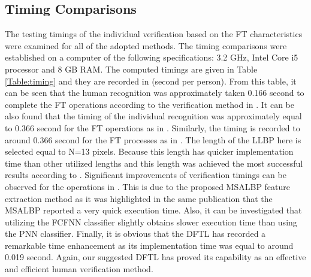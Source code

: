 \documentclass[conference]{IEEEtran}
\begin{document}
\subsection{Timing Comparisons}
The testing timings of the individual verification based on the FT characteristics were examined for all of the adopted methods. The timing comparisons were established on a computer of the following specifications: 3.2 GHz, Intel Core i5 processor and 8 GB RAM. The computed timings are given in Table \ref{Table:timing} and they are recorded in (second per person). From this table, it can be seen that the human recognition was approximately taken 0.166 second to complete the FT operations according to the verification method in \cite{Al-Nima2015Human}. It can be also found that the timing of the individual recognition was approximately equal to 0.366 second for the FT operations as in \cite{Al-Nima2017Robust}. Similarly, the timing is recorded to around 0.366 second for the FT processes as in \cite{Al-Nima2017efficient}. The length of the LLBP here is selected equal to N=13 pixels. Because this length has quicker implementation time than other utilized lengths \cite{Al-Nima2017Signal} and this length was achieved the most successful results according to \cite{Al-Nima2017efficient}. Significant improvements of verification timings can be observed for the operations in \cite{Al-Nima2017finger}. This is due to the proposed MSALBP feature extraction method as it was highlighted in the same publication that the MSALBP reported a very quick execution time. Also, it can be investigated that utilizing the FCFNN classifier slightly obtains slower execution time than using the PNN classifier. Finally, it is obvious that the DFTL has recorded a remarkable time enhancement as its implementation time was equal to around 0.019 second. Again, our suggested DFTL has proved its capability as an effective and efficient human verification method. 
\end{document}
